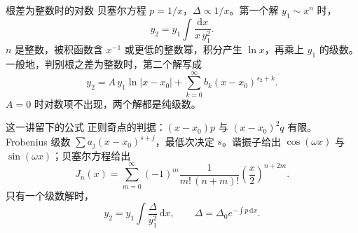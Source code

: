 \documentclass[fontset=windows, chinese, 10pt, xcolor=dvipsnames]{beamer}
\begin{document}
\begin{frame}{根差为整数时的对数}
  贝塞尔方程 $p=1/x$，$\Delta\propto 1/x$。第一个解 $y_1\sim x^n$ 时，
  \[
    y_2=y_1\int\frac{\mathrm{d}x}{x\,y_1^2}.
  \]
  $n$ 是整数，被积函数含 $x^{-1}$ 或更低的整数幂，积分产生 $\ln x$，再乘上 $y_1$ 的级数。
  \vspace{0.35em}
  一般地，判别根之差为整数时，第二个解写成
  \[
    y_2=A\,y_1\ln|x-x_0|
    +\sum_{k=0}^{\infty}b_k(x-x_0)^{s_2+k}.
  \]
  $A=0$ 时对数项不出现，两个解都是纯级数。
\end{frame}

\begin{frame}{这一讲留下的公式}
  正则奇点的判据：$(x-x_0)p$ 与 $(x-x_0)^2 q$ 有限。
  \vspace{0.35em}
  Frobenius 级数 $\sum a_j(x-x_0)^{s+j}$，最低次决定 $s$。谐振子给出 $\cos(\omega x)$ 与 $\sin(\omega x)$；贝塞尔方程给出
  \[
    J_n(x)
    =\sum_{m=0}^{\infty}(-1)^m
      \frac{1}{m!\,(n+m)!}
      \left(\frac{x}{2}\right)^{n+2m}.
  \]
  只有一个级数解时，
  \[
    y_2=y_1\int\frac{\Delta}{y_1^2}\,\mathrm{d}x,
    \qquad
    \Delta=\Delta_0 e^{-\int p\,\mathrm{d}x}.
  \]
\end{frame}
\end{document}
